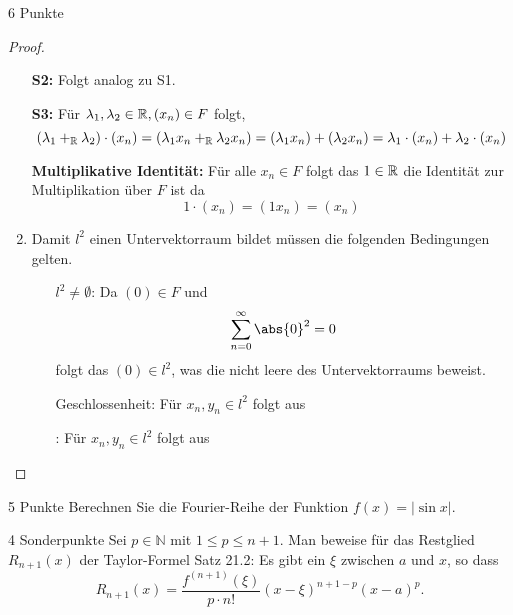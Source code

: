 \documentclass{problemset}
\begin{document}
\begin{problem}{6 Punkte}
\begin{proof}
\begin{enumerate}
              \textbf{S2:} Folgt analog zu S1.

              \textbf{S3:} Für \(\lambda_1, \lambda_2 \in \mathbb{R}, (x_n) \in F\) folgt, \[
                  (\lambda_1 +_{\mathbb{R}} \lambda_2) \cdot (x_n) = (\lambda_1 x_n +_{\mathbb{R}} \lambda_2 x_n) = (\lambda_1 x_n) + (\lambda_2 x_n) = \lambda_1 \cdot (x_n) + \lambda_2 \cdot (x_n)
              \]

              \textbf{Multiplikative Identität:} Für alle \(x_n \in F\) folgt das \(1 \in \mathbb{R}\) die Identität zur Multiplikation über \(F\) ist da \[
                  1 \cdot (x_n) = (1 x_n) = (x_n)
              \]

        \item Damit \(l^2\) einen Untervektorraum bildet müssen die folgenden
              Bedingungen gelten.

              \begin{enumerate}
                  \item[\(l^2 \neq \emptyset\):] Da \((0) \in F\) und \[
                            \sum_{n = 0}^\infty \abs{0}^2 = 0
                        \] folgt das \((0) \in l^2\), was die nicht leere des
                           Untervektorraums beweist.

                  \item[Geschlossenheit:] Für \(x_n, y_n \in l^2\) folgt aus

                  \item[\(\):] Für \(x_n, y_n \in l^2\) folgt aus
              \end{enumerate}
    \end{enumerate}

\end{proof}

\end{problem}

\begin{problem}{5 Punkte}
Berechnen Sie die Fourier-Reihe der Funktion $f(x) = |\sin x|$.
\end{problem}

\begin{problem}{4 Sonderpunkte}
Sei $p \in \mathbb{N}$ mit $1 \leq p \leq n + 1$. Man beweise für das Restglied $R_{n+1}(x)$ der Taylor-Formel Satz 21.2: Es gibt ein $\xi$ zwischen $a$ und $x$, so dass
\[ R_{n+1}(x) = \frac{f^{(n+1)}(\xi)}{p \cdot n!} (x - \xi)^{n+1-p} (x - a)^p. \]
\end{problem}
\end{document}
